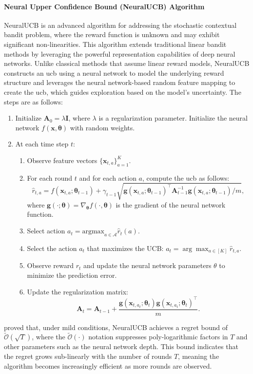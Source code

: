 \paragraph{Neural Upper Confidence Bound (NeuralUCB) Algorithm}
NeuralUCB \citep{zhou2020neural} is an advanced algorithm for addressing the stochastic contextual bandit problem, where the reward function is unknown and may exhibit significant non-linearities. This algorithm extends traditional linear bandit methods by leveraging the powerful representation capabilities of deep neural networks. Unlike classical methods that assume linear reward models, NeuralUCB constructs an \acf{ucb} using a neural network to model the underlying reward structure and leverages the neural network-based random feature mapping to create the \ac{ucb}, which guides exploration based on the model's uncertainty. The steps are as follows:
\begin{enumerate}
    \item Initialize $\mathbf{A}_0 = \lambda \mathbf{I}$, where $\lambda$ is a regularization parameter. Initialize the neural network $f (\mathbf{x}, \boldsymbol{\theta})$ with random weights. 
    \item At each time step $t$:
    \begin{enumerate}
        \item Observe feature vectors $\{\mathbf{x}_{t,a}\}_{a=1}^K$.
        \item For each round \( t \) and for each action \( a \), compute the \ac{ucb} as follows:
        \[
        \hat{r}_{t,a} = f(\mathbf{x}_{t,a}; \boldsymbol{\theta}_{t-1}) + \gamma_{t-1} \sqrt{\mathbf{g}(\mathbf{x}_{t,a}; \boldsymbol{\theta}_{t-1})^\top \mathbf{A}_{t-1}^{-1} \mathbf{g}(\mathbf{x}_{t,a}; \boldsymbol{\theta}_{t-1}) / m}, 
        \]
        where $\mathbf{g}(\cdot; \boldsymbol{\theta}) = \nabla_{\boldsymbol{\theta}} f(\cdot, \boldsymbol{\theta})$ is the gradient of the neural network function. 
        \item Select action $a_t = \text{argmax}_{a \in \mathcal{A}} \hat{r}_t(a)$.
        \item Select the action \( a_t \) that maximizes the UCB: $ a_t = \arg\max_{a \in [K]} \hat{r}_{t,a}.$
        \item Observe reward $r_t$ and update the neural network parameters $\theta$ to minimize the prediction error.
        \item Update the regularization matrix:
            \[
            \mathbf{A}_t = \mathbf{A}_{t-1} + \frac{\mathbf{g}(\mathbf{x}_{t,a_t}; \boldsymbol{\theta}_t) \mathbf{g}(\mathbf{x}_{t,a_t}; \boldsymbol{\theta}_t)^\top}{m}.
            \]
    \end{enumerate}
\end{enumerate}
\citet{zhou2020neural} proved that, under mild conditions, NeuralUCB achieves a regret bound of $\widetilde{\mathcal{O}}(\sqrt{T})$, where the $\widetilde{\mathcal{O}}(\cdot)$ notation suppresses poly-logarithmic factors in $T$ and other parameters such as the neural network depth. This bound indicates that the regret grows sub-linearly with the number of rounds $T$, meaning the algorithm becomes increasingly efficient as more rounds are observed.

